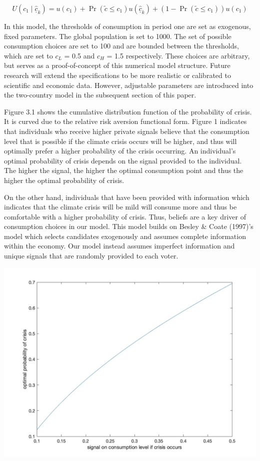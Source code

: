 \documentclass[11pt,preprint, authoryear]{elsarticle}
\let\origfigure\figure
\let\endorigfigure\endfigure
\renewenvironment{figure}[1][2] {
    \expandafter\origfigure\expandafter[H]
} {
    \endorigfigure
}
\numberwithin{equation}{section}
\numberwithin{figure}{section}
\numberwithin{table}{section}
\begin{document}
\[
U\left(c_1 \mid \hat{\underline{c}}_{k}\right)=u\left(c_1\right)+\operatorname{Pr}\left(\tilde{c} \leq c_1\right) u\left(\hat{\underline{c}}_{k}\right)+\left(1-\operatorname{Pr}\left(\tilde{c} \leq c_1\right)\right) u\left(c_1\right)
\]

In this model, the thresholds of consumption in period one are set as
exogenous, fixed parameters. The global population is set to 1000. The
set of possible consumption choices are set to 100 and are bounded
between the thresholds, which are set to \(c_L\) = 0.5 and \(c_H\) = 1.5
respectively. These choices are arbitrary, but serves as a
proof-of-concept of this numerical model structure. Future research will
extend the specifications to be more realistic or calibrated to
scientific and economic data. However, adjustable parameters are
introduced into the two-country model in the subsequent section of this
paper.

Figure 3.1 shows the cumulative distribution function of the probability
of crisis. It is curved due to the relative risk aversion functional
form. Figure 1 indicates that individuals who receive higher private
signals believe that the consumption level that is possible if the
climate crisis occurs will be higher, and thus will optimally prefer a
higher probability of the crisis occurring. An individual's optimal
probability of crisis depends on the signal provided to the individual.
The higher the signal, the higher the optimal consumption point and thus
the higher the optimal probability of crisis.

On the other hand, individuals that have been provided with information
which indicates that the climate crisis will be mild will consume more
and thus be comfortable with a higher probability of crisis. Thus,
beliefs are a key driver of consumption choices in our model. This model
builds on Besley \& Coate (1997)'s model which selects candidates
exogenously and assumes complete information within the economy. Our
model instead assumes imperfect information and unique signals that are
randomly provided to each voter.

\begin{figure}[H]

{\centering \includegraphics[width=0.75\linewidth]{images/Figure1base} 

}

\caption{Optimal probability of crisis as mapped from different beliefs about the optimal consumption level}\label{fig:Fig 3.1}
\end{figure}
\end{document}
